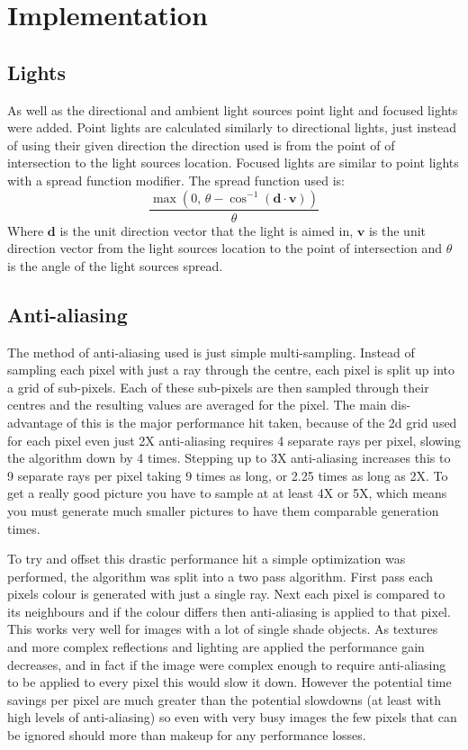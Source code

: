 \chapter{Implementation}
  \section{Lights}
    As well as the directional and ambient light sources point light and focused
    lights were added.  Point lights are calculated similarly to directional
    lights, just instead of using their given direction the direction used is
    from the point of of intersection to the light sources location.  Focused
    lights are similar to point lights with a spread function modifier.  The
    spread function used is:
    \[ \frac{\max\left(0,\, \theta - \cos^{-1}\left( \mathbf{d} \cdot
    \mathbf{v}\right)\right)}{\theta} \]
    Where $\mathbf{d}$ is the unit direction vector that the light is aimed in,
    $\mathbf{v}$ is the unit direction vector from the light sources location to
    the point of intersection and $\theta$ is the angle of the light sources
    spread.

  \section{Anti-aliasing}
    The method of anti-aliasing used is just simple multi-sampling.  Instead of
    sampling each pixel with just a ray through the centre, each pixel is split
    up into a grid of sub-pixels.  Each of these sub-pixels are then sampled
    through their centres and the resulting values are averaged for the pixel.
    The main dis-advantage of this is the major performance hit taken, because
    of the 2d grid used for each pixel even just 2X anti-aliasing requires 4
    separate rays per pixel, slowing the algorithm down by 4 times.  Stepping up
    to 3X anti-aliasing increases this to 9 separate rays per pixel taking 9
    times as long, or 2.25 times as long as 2X.  To get a really good picture
    you have to sample at at least 4X or 5X, which means you must generate much
    smaller pictures to have them comparable generation times.

    To try and offset this drastic performance hit a simple optimization was
    performed, the algorithm was split into a two pass algorithm.  First pass
    each pixels colour is generated with just a single ray.  Next each pixel is
    compared to its neighbours and if the colour differs then anti-aliasing is
    applied to that pixel.  This works very well for images with a lot of single
    shade objects.  As textures and more complex reflections and lighting are
    applied the performance gain decreases, and in fact if the image were complex
    enough to require anti-aliasing to be applied to every pixel this would slow
    it down.  However the potential time savings per pixel are much greater than
    the potential slowdowns (at least with high levels of anti-aliasing) so even
    with very busy images the few pixels that can be ignored should more than
    makeup for any performance losses.

